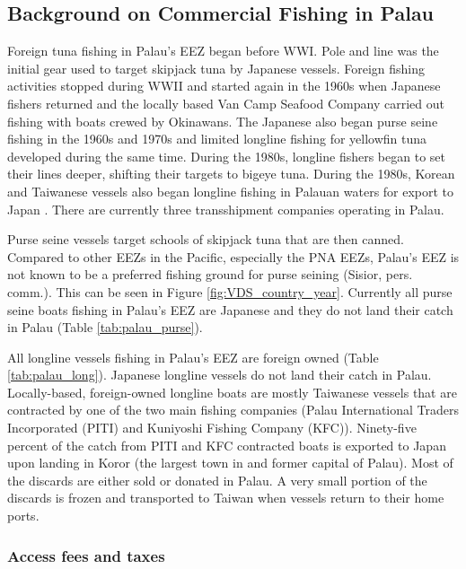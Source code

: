 \documentclass[9pt,twoside,lineno]{pnas-new}
\begin{document}
\subsection{Background on Commercial Fishing in Palau}\label{Palau_back}

Foreign tuna fishing in Palau’s EEZ began before WWI. Pole and line was the initial gear used to target skipjack tuna by Japanese vessels. Foreign fishing activities stopped during WWII and started again in the 1960s when Japanese fishers returned and the locally based Van Camp Seafood Company carried out fishing with boats crewed by Okinawans. The Japanese also began purse seine fishing in the 1960s and 1970s and limited longline fishing for yellowfin tuna developed during the same time. During the 1980s, longline fishers began to set their lines deeper, shifting their targets to bigeye tuna. During the 1980s, Korean and Taiwanese vessels also began longline fishing in Palauan waters for export to Japan \citep{chapman2000development}. There are currently three transshipment companies operating in Palau.

Purse seine vessels target schools of skipjack tuna that are then canned. Compared to other EEZs in the Pacific, especially the PNA EEZs, Palau’s EEZ is not known to be a preferred fishing ground for purse seining (Sisior, pers. comm.). This can be seen in Figure \ref{fig:VDS_country_year}. Currently all purse seine boats fishing in Palau’s EEZ are Japanese and they do not land their catch in Palau (Table \ref{tab:palau_purse}). 



All longline vessels fishing in Palau’s EEZ are foreign owned (Table \ref{tab:palau_long}). Japanese longline vessels do not land their catch in Palau. Locally-based, foreign-owned longline boats are mostly Taiwanese vessels that are contracted by one of the two main fishing companies (Palau International Traders Incorporated (PITI) and Kuniyoshi Fishing Company (KFC)). Ninety-five percent of the catch from PITI and KFC contracted boats is exported to Japan upon landing in Koror (the largest town in and former capital of Palau). Most of the discards are either sold or donated in Palau. A very small portion of the discards is frozen and transported to Taiwan when vessels return to their home ports.




\subsubsection{Access fees and taxes}
\end{document}
